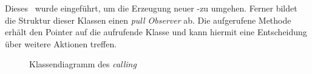
Dieses \Pack\ wurde eingeführt, um die Erzeugung neuer \ROS-\Msg[s] zu umgehen. Ferner bildet die Struktur dieser Klassen einen \textit{pull Observer} ab.
Die aufgerufene Methode erhält den Pointer auf die aufrufende Klasse und kann hiermit eine Entscheidung über weitere Aktionen treffen.




\begin{figure}[ht!]
\vspace{0.25cm}
\begin{center}
\caption{Klassendiagramm des \textit{calling} \Pack[s]}
\label{fig:PackCaller}
\end{center}

\vspace{0.25cm}
\end{figure}


